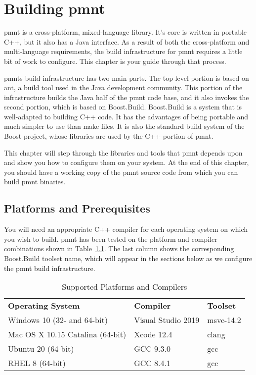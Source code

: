 
\chapter{Building \acl{pmnt}}
\label{chapter-building-parliament}

\ac{pmnt} is a cross-platform, mixed-language library.  It's core is written in portable C++, but it also has a Java interface.  As a result of both the cross-platform and multi-language requirements, the build infrastructure for \ac{pmnt} requires a little bit of work to configure.  This chapter is your guide through that process.

\acp{pmnt} build infrastructure has two main parts.  The top-level portion is based on ant, a build tool used in the Java development community.  This portion of the infrastructure builds the Java half of the \ac{pmnt} code base, and it also invokes the second portion, which is based on Boost.Build.  Boost.Build is a system that is well-adapted to building C++ code.  It has the advantages of being portable and much simpler to use than make files.  It is also the standard build system of the Boost project, whose libraries are used by the C++ portion of \ac{pmnt}.

This chapter will step through the libraries and tools that \ac{pmnt} depends upon and show you how to configure them on your system.  At the end of this chapter, you should have a working copy of the \ac{pmnt} source code from which you can build \ac{pmnt} binaries.

\section{Platforms and Prerequisites}

You will need an appropriate C++ compiler for each operating system on which you wish to build.  \ac{pmnt} has been tested on the platform and compiler combinations shown in Table~\ref{platforms-and-compilers}.  The last column shows the corresponding Boost.Build toolset name, which will appear in the sections below as we configure the \ac{pmnt} build infrastructure.

\begin{table}[htbp]
	\centering
	\begin{tabular}{lll}
		\toprule
		\textbf{Operating System} & \textbf{Compiler} & \textbf{Toolset} \\
		\headingrule
		Windows 10 (32- and 64-bit) & Visual Studio 2019 & msvc-14.2 \\
		\midrule
		Mac OS X 10.15 Catalina (64-bit) & Xcode 12.4 & clang \\
		\midrule
		Ubuntu 20 (64-bit) & GCC 9.3.0 & gcc \\
		\midrule
		RHEL 8 (64-bit) & GCC 8.4.1 & gcc \\
		\bottomrule
	\end{tabular}
	\caption{Supported Platforms and Compilers}
	\label{platforms-and-compilers}
\end{table}

